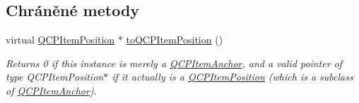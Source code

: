\subsection*{Chráněné metody}
\begin{DoxyCompactItemize}
\item 
virtual \hyperlink{classQCPItemPosition}{Q\+C\+P\+Item\+Position} $\ast$ \hyperlink{classQCPItemPosition_a577a7efc601df85a20b3e709d1ac320e}{to\+Q\+C\+P\+Item\+Position} ()
\begin{DoxyCompactList}\small\item\em Returns 0 if this instance is merely a \hyperlink{classQCPItemAnchor}{Q\+C\+P\+Item\+Anchor}, and a valid pointer of type Q\+C\+P\+Item\+Position$\ast$ if it actually is a \hyperlink{classQCPItemPosition}{Q\+C\+P\+Item\+Position} (which is a subclass of \hyperlink{classQCPItemAnchor}{Q\+C\+P\+Item\+Anchor}). \end{DoxyCompactList}\end{DoxyCompactItemize}
